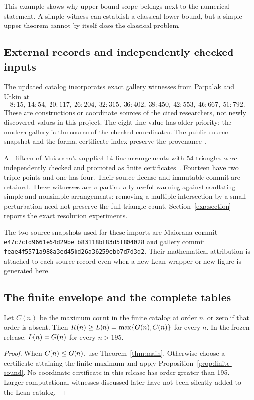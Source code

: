 This example shows why upper-bound scope belongs next to the numerical statement. A simple witness can establish a classical lower bound, but a simple upper theorem cannot by itself close the classical problem.

\subsection{External records and independently checked inputs}

The updated catalog incorporates exact gallery witnesses from Parpalak and Utkin at
\[
8:15,\ 14:54,\ 20:117,\ 26:204,\ 32:315,\ 36:402,\ 38:450,\ 42:553,\ 46:667,\ 50:792.
\]
These are constructions or coordinate sources of the cited researchers, not newly discovered values in this project. The eight-line value has older priority; the modern gallery is the source of the checked coordinates. The public source snapshot and the formal certificate index preserve the provenance~\cite{parpalakutkin2026,oeisA006066}.

All fifteen of Maiorana's supplied 14-line arrangements with 54 triangles were independently checked and promoted as finite certificates~\cite{maiorana2026}. Fourteen have two triple points and one has four. Their source license and immutable commit are retained. These witnesses are a particularly useful warning against conflating simple and nonsimple arrangements: removing a multiple intersection by a small perturbation need not preserve the full triangle count. Section~\ref{exp:section} reports the exact resolution experiments.

The two source snapshots used for these imports are Maiorana commit
\nolinkurl{e47c7cfd9661e54d29befb83118bf83d5f804028} and gallery commit
\nolinkurl{feae4f5571a988a3ed45bd26a36259ebb7d7d3d2}. Their mathematical attribution is attached to each source record even when a new Lean wrapper or new figure is generated here.

\subsection{The finite envelope and the complete tables}

\begin{proposition}\label{prop:envelope}
Let $C(n)$ be the maximum count in the finite catalog at order $n$, or zero if that order is absent. Then $K(n)\ge L(n)=\max\{G(n),C(n)\}$ for every $n$. In the frozen release, $L(n)=G(n)$ for every $n>195$.
\end{proposition}
\begin{proof}
When $C(n)\le G(n)$, use Theorem~\ref{thm:main}. Otherwise choose a certificate attaining the finite maximum and apply Proposition~\ref{prop:finite-sound}. No coordinate certificate in this release has order greater than 195. Larger computational witnesses discussed later have not been silently added to the Lean catalog.
\end{proof}

